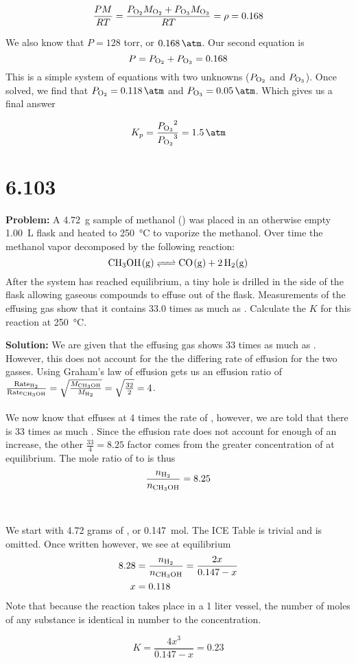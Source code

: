 \documentclass[11 pt]{article}
\begin{document}
     $$ \frac{PM}{RT} = \frac{P_{\ce{O2}}M_{\ce{O2}} + P_{\ce{O3}}M_{\ce{O3}}}{RT} = \rho = 0.168 $$
    
    We also know that $P = 128$ torr, or $\SI{.168}{\atm}$. Our second equation is $$P = P_{\ce{O2}} + P_{\ce{O3}} = 0.168$$
    This is a simple system of equations with two unknowns ($P_{\ce{O2}}$ and $P_{\ce{O3}}$). Once solved, we find that
    $P_{\ce{O2}} = \SI{0.118}{\atm}$ and $P_{\ce{O3}} = \SI{0.05}{\atm}$. Which gives us a final answer
    \begin{answerBox}
    $$K_p = \frac{{P_{\ce{O3}}}^2}{{P_{\ce{O2}}}^3} = \SI{1.5}{\per\atm}$$
    \end{answerBox}
    \newpage
    \section*{6.103}
    \begin{problemBox}
        \textbf{Problem:} A \SI{4.72}{\gram} sample of methanol () was placed in an otherwise empty \SI{1.00}{\liter} flask and heated to
        \SI{250}{\celsius} to vaporize the methanol. Over time the methanol vapor decomposed by the following reaction:
        $$\ce{CH3OH(g) <=> CO(g) + 2H2(g)}$$ After the system has reached equilibrium, a tiny hole is drilled in the side of the flask
        allowing gaseous compounds to effuse out of the flask. Measurements of the effusing gas show that it contains
        33.0 times as much  as . Calculate the $K$ for this reaction at \SI{250}{\celsius}. 
    \end{problemBox}
    \textbf{Solution:} We are given that the effusing gas shows 33 times as much  as . However, this
    does not account for the the differing rate of effusion for the two gasses. Using Graham's law of effusion gets us an
    effusion ratio of
    $\frac{\text{Rate}_{\ce{H2}}}{\text{Rate}_{\ce{CH3OH}}} = \sqrt{\frac{M_{\ce{CH3OH}}}{M_{\ce{H2}}}} = \sqrt{\frac{32}{2}} = 4$. \\ \\
    We now know that  effuses at 4 times the rate of , however, we are told that there is 33 times as much . Since the effusion
    rate does not account for enough of an increase, the other $\frac{33}{4} = 8.25$ factor comes from the greater concentration of  at equilibrium.
    The mole ratio of  to  is thus $$\frac{n_{\ce{H2}}}{n_{\ce{CH3OH}}} = 8.25 $$\\ \\
    We start with 4.72 grams of , or \SI{0.147}{\mole}. The ICE Table is trivial and is omitted. Once written however,
    we see at equilibrium 
    \begin{align*}
      8.28 &= \frac{n_{\ce{H2}}}{n_{\ce{CH3OH}}} = \frac{2x}{0.147 - x} \\
      x &= 0.118
    \end{align*}
    Note that because the reaction takes place in a 1 liter vessel, the number of moles of any substance is identical
    in number to the concentration. 
    \begin{answerBox}
        $$K = \frac{4x^3}{0.147 - x} = 0.23$$
    \end{answerBox}
    \newpage
    \newpage
\end{document}
